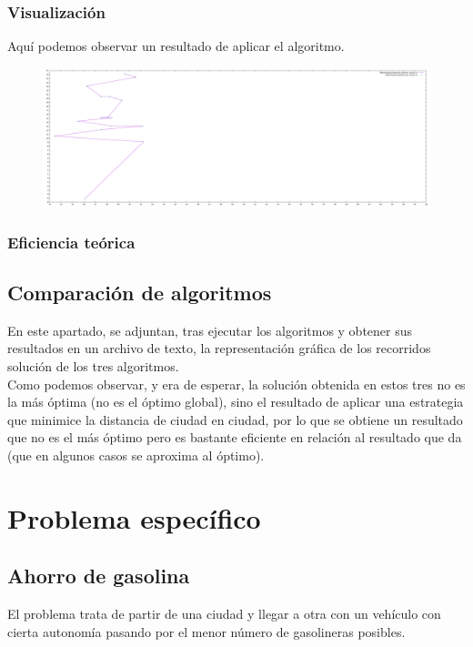 \documentclass[11pt,a4paper]{article} %
\begin{document}
\subsubsection{Visualización}
Aquí podemos observar un resultado de aplicar el algoritmo.
\begin{figure}[H]
	\centering
	\includegraphics[width=13cm]{data/graphics/otro/otro.pdf}
\end{figure}

\subsubsection{Eficiencia teórica}


\newpage
\subsection{Comparación de algoritmos}
En este apartado, se adjuntan, tras ejecutar los algoritmos y obtener sus resultados en un archivo de texto, la representación gráfica de los recorridos solución de los tres algoritmos.\\

Como podemos observar, y era de esperar, la solución obtenida en estos tres no es la más óptima (no es el óptimo global), sino el resultado de aplicar una estrategia que minimice la distancia de ciudad en ciudad, por lo que se obtiene un resultado que no es el más óptimo pero es bastante eficiente en relación al resultado que da (que en algunos casos se aproxima al óptimo).



\newpage
\section{Problema específico}
\subsection{Ahorro de gasolina}
El problema trata de partir de una ciudad y llegar a otra con un vehículo con cierta autonomía pasando por el menor número de gasolineras posibles.\\
\end{document}
